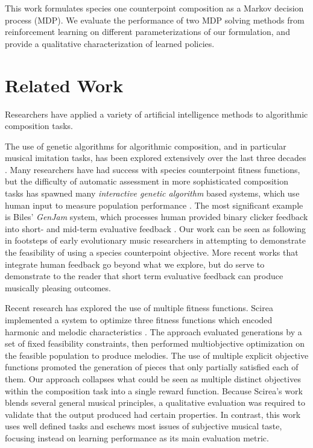 \documentclass{article}
\begin{document}
    This work formulates species one counterpoint composition as a Markov decision process (MDP). We evaluate the performance of two MDP solving methods from reinforcement learning on different parameterizations of our formulation, and provide a qualitative characterization of learned policies. 

	\section{Related Work}
    Researchers have applied a variety of artificial intelligence methods to algorithmic composition tasks.

    The use of genetic algorithms for algorithmic composition, and in particular musical imitation tasks, has been explored extensively over the last three decades \cite{Miranda2007}. Many researchers have had success with species counterpoint fitness functions, but the difficulty of automatic assessment in more sophisticated composition tasks has spawned many \textit{interactive genetic algorithm} based systems, which use human input to measure population performance \cite{Fernandez2013}. The most significant example is Biles' \textit{GenJam} system, which processes human provided binary clicker feedback into short- and mid-term evaluative feedback \cite{Biles94}. Our work can be seen as following in footsteps of early evolutionary music researchers in attempting to demonstrate the feasibility of using a species counterpoint objective. More recent works that integrate human feedback go beyond what we explore, but do serve to demonstrate to the reader that short term evaluative feedback can produce musically pleasing outcomes.
    
    Recent research has explored the use of multiple fitness functions. Scirea implemented a system to optimize three fitness functions which encoded harmonic and melodic characteristics \cite{Scirea2016}. The approach evaluated generations by a set of fixed feasibility constraints, then performed multiobjective optimization on the feasible population to produce melodies. The use of multiple explicit objective functions promoted the generation of pieces that only partially satisfied each of them. Our approach collapses what could be seen as multiple distinct objectives within the composition task into a single reward function. Because Scirea's work blends several general musical principles, a qualitative evaluation was required to validate that the output produced had certain properties. In contrast, this work uses well defined tasks and eschews most issues of subjective musical taste, focusing instead on learning performance as its main evaluation metric.
\end{document}

